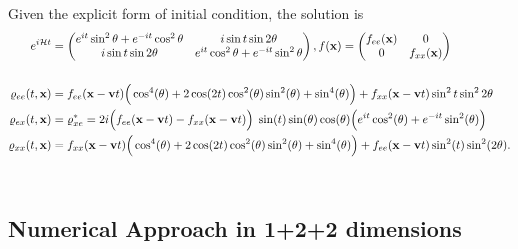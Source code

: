 \documentclass[11pt,a4paper]{article}
\begin{document}
Given the explicit form of initial condition, the solution is
\begin{align*}
   e^{i\mathcal{H}t} &= \begin{pmatrix} 
      e^{it}\sin^{2}{\theta} + e^{-it}\cos^{2}{\theta}& i\sin{t} \sin{2\theta}\\
      i\sin t  \sin 2\theta & e^{it} \cos^{2}\theta + e^{-it}\sin^{2}\theta\\
   \end{pmatrix} , 
   f(\vb{x}) = \begin{pmatrix} 
      f_{ee}(\vb{x}) & 0\\
      0 & f_{xx}(\vb{x})\\
   \end{pmatrix}\\
   \\
      \varrho_{ee}(t,\vb{x}) &=  
      f_{ee}(\vb{x} - \vb{v}t) \Big(\cos^{4}(\theta) + 2\cos (2t) \cos ^{2} (\theta) \sin^{2}(\theta) + \sin^{4} (\theta)\Big) + f_{x x}(\vb{x} - \vb{v}t)  \sin ^{2}t \sin ^{2 }2\theta \\ 
      \varrho_{ex}(t, \vb{x}) &= \varrho_{xe}^{*} = 2i \Big(f_{ee}(\vb{x} - \vb{v}t) - f_{x x} (\vb{x} - \vb{v}t)\Big) \hspace{0.1cm}\sin(t) \sin(\theta) \cos(\theta) \Big(e^{it}\cos^{2}(\theta) + e^{-it}\sin ^{2}(\theta)\Big)\\
      \varrho_{x x}(t, \vb{x}) &= f_{x x}(\vb{x} - \vb{v}t)\Big(\cos^{4}(\theta) + 2 \cos(2t) \cos^{2}(\theta) \sin^{2}(\theta)  + \sin ^{4}(\theta) \Big)  + f_{ee}(\vb{x} - \vb{v}t)\sin ^{2}(t) \sin ^{2}(2\theta)
.\end{align*}
\\


\subsection{Numerical Approach in 1+2+2 dimensions}%
\label{sub:Numrical Approach in 1+2+2 dimensions}
\end{document}
